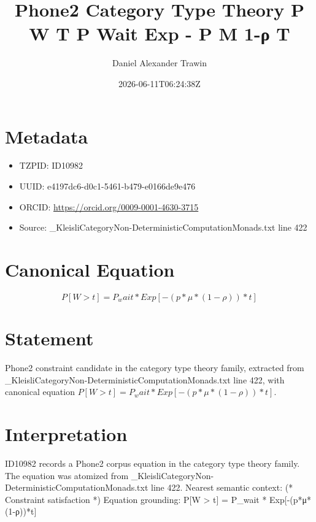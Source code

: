 \documentclass[11pt]{article}
\title{Phone2 Category Type Theory P W T P Wait Exp - P Μ 1-ρ T}
\author{Daniel Alexander Trawin}
\date{2026-06-11T06:24:38Z}
\begin{document}
\maketitle
\section*{Metadata}
\begin{itemize}
\item TZPID: ID10982
\item UUID: e4197dc6-d0c1-5461-b479-e0166de9e476
\item ORCID: \url{https://orcid.org/0009-0001-4630-3715}
\item Source: _KleisliCategoryNon-DeterministicComputationMonads.txt line 422
\end{itemize}
\section*{Canonical Equation}
\[
P[W > t] = P_wait * Exp[-(p*μ*(1-ρ))*t]
\]
\section*{Statement}
Phone2 constraint candidate in the category type theory family, extracted from _KleisliCategoryNon-DeterministicComputationMonads.txt line 422, with canonical equation $P[W > t] = P_wait * Exp[-(p*μ*(1-ρ))*t]$.
\section*{Interpretation}
ID10982 records a Phone2 corpus equation in the category type theory family. The equation was atomized from _KleisliCategoryNon-DeterministicComputationMonads.txt line 422. Nearest semantic context: (* Constraint satisfaction *) Equation grounding: P[W > t] = P_wait * Exp[-(p*μ*(1-ρ))*t]
\end{document}
